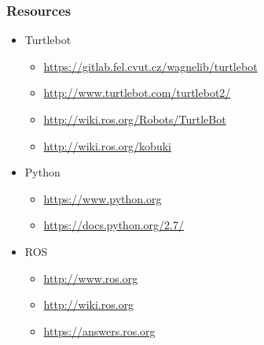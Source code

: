 \documentclass{beamer}
\begin{document}
\begin{frame}[fragile]
  \frametitle{Resources}
   \begin{itemize}
   \item Turtlebot
     \begin{itemize}
     \item \url{https://gitlab.fel.cvut.cz/wagnelib/turtlebot}
     \item \url{http://www.turtlebot.com/turtlebot2/}
     \item \url{http://wiki.ros.org/Robots/TurtleBot}
     \item \url{http://wiki.ros.org/kobuki}
     \end{itemize}
   \item Python
     \begin{itemize}
     \item \url{https://www.python.org}
     \item \url{https://docs.python.org/2.7/}
     \end{itemize}
   \item ROS
     \begin{itemize}
     \item \url{http://www.ros.org}
     \item \url{http://wiki.ros.org}
     \item \url{https://answers.ros.org}
     \end{itemize}
   \end{itemize}
\end{frame}
\end{document}
